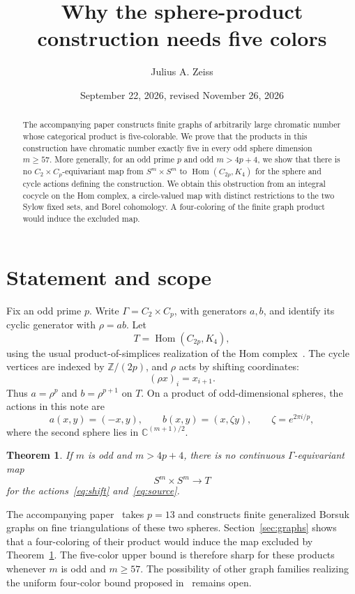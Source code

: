 \documentclass[11pt]{amsart}
\title{Why the sphere-product construction needs five colors}
\author{Julius A. Zeiss}
\date{September 22, 2026, revised November 26, 2026}
\newtheorem{theorem}{Theorem}[section]
\theoremstyle{remark}
\numberwithin{equation}{section}
\newcommand{\C}{\mathbb C}
\newcommand{\Z}{\mathbb Z}
\newcommand{\Hom}{\operatorname{Hom}}
\begin{document}
\begin{abstract}
The accompanying paper constructs finite graphs of arbitrarily large chromatic number whose categorical product is five-colorable. We prove that the products in this construction have chromatic number exactly five in every odd sphere dimension $m\geq57$. More generally, for an odd prime $p$ and odd $m>4p+4$, we show that there is no $C_2\times C_p$-equivariant map from $S^m\times S^m$ to $\Hom(C_{2p},K_4)$ for the sphere and cycle actions defining the construction. We obtain this obstruction from an integral cocycle on the Hom complex, a circle-valued map with distinct restrictions to the two Sylow fixed sets, and Borel cohomology. A four-coloring of the finite graph product would induce the excluded map.
\end{abstract}
\maketitle

\section{Statement and scope}

Fix an odd prime $p$. Write $\Gamma=C_2\times C_p$, with generators $a,b$, and identify its cyclic generator with $\rho=ab$. Let
\[
 T=\Hom(C_{2p},K_4),
\]
using the usual product-of-simplices realization of the Hom complex~\cite{BabsonKozlov}. The cycle vertices are indexed by $\Z/(2p)$, and $\rho$ acts by shifting coordinates:
\begin{equation}\label{eq:shift}
 (\rho x)_i=x_{i+1}.
\end{equation}
Thus $a=\rho^p$ and $b=\rho^{p+1}$ on $T$. On a product of odd-dimensional spheres, the actions in this note are
\begin{equation}\label{eq:source}
 a(x,y)=(-x,y),\qquad b(x,y)=(x,\zeta y),
 \qquad \zeta=e^{2\pi i/p},
\end{equation}
where the second sphere lies in $\C^{(m+1)/2}$.

\begin{theorem}\label{thm:no-map}
If $m$ is odd and $m>4p+4$, there is no continuous $\Gamma$-equivariant map
\[
 S^m\times S^m\longrightarrow T
\]
for the actions~\eqref{eq:shift} and~\eqref{eq:source}.
\end{theorem}

The accompanying paper~\cite{Companion} takes $p=13$ and constructs finite generalized Borsuk graphs on fine triangulations of these two spheres. Section~\ref{sec:graphs} shows that a four-coloring of their product would induce the map excluded by Theorem~\ref{thm:no-map}. The five-color upper bound is therefore sharp for these products whenever $m$ is odd and $m\geq57$. The possibility of other graph families realizing the uniform four-color bound proposed in~\cite{Raanes} remains open.
\end{document}
